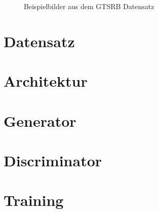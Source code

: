 \begin{figure}[H]
\begin{subfigure}[b]{0.2\textwidth}
    \caption{}
    \label{fig:gtrsb-paper-bsp-image-4}
\end{subfigure}
      \caption{Beispielbilder aus dem \acs{GTSRB} Datensatz \cite{GTSRB}}
      \label{fig:gtrsb-paper-bsp-images}
\end{figure}
\cite{GTSRB}
\section{Datensatz}
\section{Architektur}
\section{Generator}
\section{Discriminator}
\section{Training}